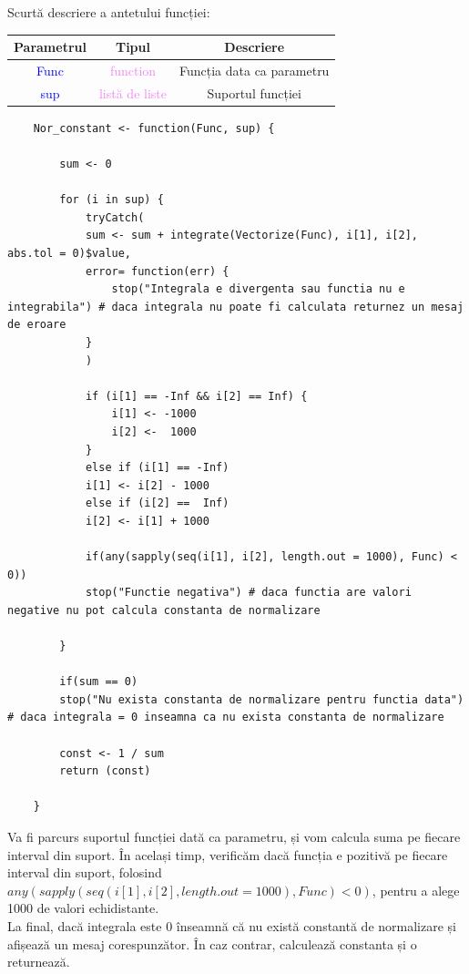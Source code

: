 \documentclass[12pt]{article}
\begin{document}
\indent Scurtă descriere a antetului funcției: \\
\begin{center}
	\begin{tabular}{|| c | c | c ||}
		\hline
		Parametrul & Tipul & Descriere \\
		\hline
		\textcolor{blue}{Func} & \textcolor{violet}{function} & Funcția data ca parametru \\
		\hline
		\textcolor{blue}{sup} & \textcolor{violet}{listă de liste} & Suportul funcției \\
		\hline
	\end{tabular}
\end{center}\hfill \pagebreak
\begin{lstlisting}
	Nor_constant <- function(Func, sup) {
		
		sum <- 0
		
		for (i in sup) {
			tryCatch(
			sum <- sum + integrate(Vectorize(Func), i[1], i[2], abs.tol = 0)$value,
			error= function(err) {
				stop("Integrala e divergenta sau functia nu e integrabila") # daca integrala nu poate fi calculata returnez un mesaj de eroare
			}
			)
			
			if (i[1] == -Inf && i[2] == Inf) {
				i[1] <- -1000
				i[2] <-  1000
			}
			else if (i[1] == -Inf)
			i[1] <- i[2] - 1000
			else if (i[2] ==  Inf)
			i[2] <- i[1] + 1000
			
			if(any(sapply(seq(i[1], i[2], length.out = 1000), Func) < 0))
			stop("Functie negativa") # daca functia are valori negative nu pot calcula constanta de normalizare
			
		}
		
		if(sum == 0)
		stop("Nu exista constanta de normalizare pentru functia data") # daca integrala = 0 inseamna ca nu exista constanta de normalizare
		
		const <- 1 / sum
		return (const)
		
	}
\end{lstlisting}

\indent Va fi parcurs suportul funcției dată ca parametru, și vom calcula suma pe fiecare interval din suport. În același timp, verificăm dacă funcția e pozitivă pe fiecare interval din suport, folosind $any(sapply(seq(i[1], i[2], length.out = 1000), Func) < 0)$, pentru a alege 1000 de valori echidistante.\hfill \\
\indent La final, dacă integrala este 0 înseamnă că nu există constantă de normalizare și afișează un mesaj corespunzător. În caz contrar, calculează constanta și o returnează.\hfill \\
\end{document}
